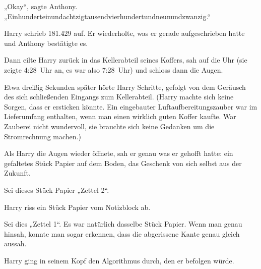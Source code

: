 „Okay“, sagte Anthony. „Einhunderteinundachtzigtausendvierhundertundneunundzwanzig.“

Harry schrieb 181.429 auf. Er wiederholte, was er gerade aufgeschrieben hatte und Anthony bestätigte es.

Dann eilte Harry zurück in das Kellerabteil seines Koffers, sah auf die Uhr (sie zeigte 4:28~Uhr an, es war also 7:28~Uhr) und schloss dann die Augen.

Etwa dreißig Sekunden später hörte Harry Schritte, gefolgt von dem Geräusch des sich schließenden Eingangs zum Kellerabteil. (Harry machte sich keine Sorgen, dass er ersticken könnte. Ein eingebauter Luftaufbereitungszauber war im Lieferumfang enthalten, wenn man einen wirklich guten Koffer kaufte. War Zauberei nicht wundervoll, sie brauchte sich keine Gedanken um die Stromrechnung machen.)

Als Harry die Augen wieder öffnete, sah er genau was er gehofft hatte: ein gefaltetes Stück Papier auf dem Boden, das Geschenk von sich selbst aus der Zukunft.

Sei dieses Stück Papier „Zettel 2“.

Harry riss ein Stück Papier vom Notizblock ab.

Sei dies „Zettel 1“. Es war natürlich dasselbe Stück Papier. Wenn man genau hinsah, konnte man sogar erkennen, dass die abgerissene Kante genau gleich aussah.

Harry ging in seinem Kopf den Algorithmus durch, den er befolgen würde.

